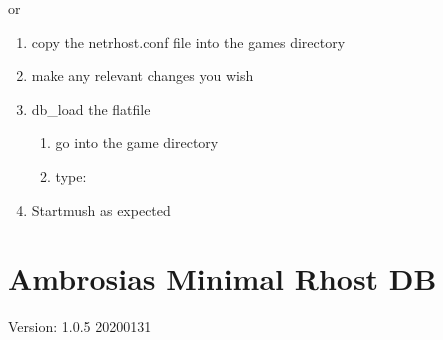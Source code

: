 \documentclass[letterpaper,10pt,english]{sphinxmanual}
\begin{document}
\sphinxAtStartPar
\sphinxhyphen{}\sphinxhyphen{}\sphinxhyphen{} or \sphinxhyphen{}\sphinxhyphen{}\sphinxhyphen{}
\begin{enumerate}
%
\item {} 
\sphinxAtStartPar
copy the netrhost.conf file into the games directory

\item {} 
\sphinxAtStartPar
make any relevant changes you wish

\item {} 
\sphinxAtStartPar
db\_load the flatfile
\begin{enumerate}
%
\item {} 
\sphinxAtStartPar
go into the game directory

\item {} 
\sphinxAtStartPar
type:

\begin{sphinxVerbatim}[commandchars=\\\{\}]
   
\end{sphinxVerbatim}

\end{enumerate}

\item {} 
\sphinxAtStartPar
Startmush as expected

\end{enumerate}


\chapter{Ambrosia\textquotesingle{}s Minimal Rhost DB}
\label{\detokenize{ambrosiadb:ambrosia-s-minimal-rhost-db}}\label{\detokenize{ambrosiadb:ambrosiadb-installation}}\label{\detokenize{ambrosiadb::doc}}
\sphinxAtStartPar
Version: 1.0.5          2020\sphinxhyphen{}01\sphinxhyphen{}31
\end{document}
